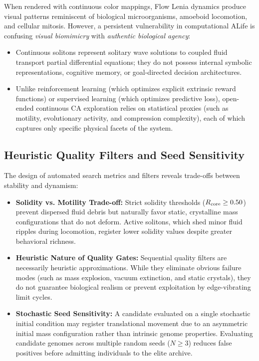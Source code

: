 When rendered with continuous color mappings, Flow Lenia dynamics produce visual patterns reminiscent of biological microorganisms, amoeboid locomotion, and cellular mitosis. However, a persistent vulnerability in computational ALife is confusing \textit{visual biomimicry} with \textit{authentic biological agency}:
\begin{itemize}
    \item Continuous solitons represent solitary wave solutions to coupled fluid transport partial differential equations; they do not possess internal symbolic representations, cognitive memory, or goal-directed decision architectures.
    \item Unlike reinforcement learning (which optimizes explicit extrinsic reward functions) or supervised learning (which optimizes predictive loss), open-ended continuous CA exploration relies on statistical proxies (such as motility, evolutionary activity, and compression complexity), each of which captures only specific physical facets of the system.
\end{itemize}

\subsection{Heuristic Quality Filters and Seed Sensitivity}
\label{subsec:disc_metric_trap}

The design of automated search metrics and filters reveals trade-offs between stability and dynamism:
\begin{itemize}
    \item \textbf{Solidity vs. Motility Trade-off:} Strict solidity thresholds ($R_{\text{core}} \ge 0.50$) prevent dispersed fluid debris but naturally favor static, crystalline mass configurations that do not deform. Active solitons, which shed minor fluid ripples during locomotion, register lower solidity values despite greater behavioral richness.
    \item \textbf{Heuristic Nature of Quality Gates:} Sequential quality filters are necessarily heuristic approximations. While they eliminate obvious failure modes (such as mass explosion, vacuum extinction, and static crystals), they do not guarantee biological realism or prevent exploitation by edge-vibrating limit cycles.
    \item \textbf{Stochastic Seed Sensitivity:} A candidate evaluated on a single stochastic initial condition may register translational movement due to an asymmetric initial mass configuration rather than intrinsic genome properties. Evaluating candidate genomes across multiple random seeds ($N \ge 3$) reduces false positives before admitting individuals to the elite archive.
\end{itemize}

